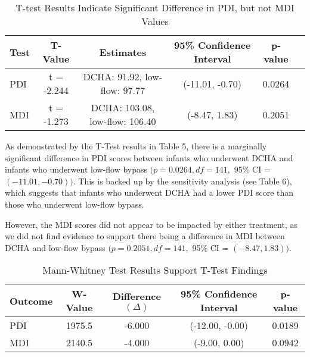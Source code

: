 \documentclass{article}
\begin{document}
\begin{enumerate}
		\newpage

		\begin{table}[h!]
			\centering
			\footnotesize
			\caption{T-test Results Indicate Significant Difference in PDI, but not MDI Values}
			\label{tab:t_test_results}
			\begin{tabular}{lccccc}
				\toprule
				\textbf{Test}   & \textbf{T-Value}  & \textbf{Estimates}           & \textbf{95\% Confidence Interval} & \textbf{p-value} \\
				\midrule
				PDI             & t = -2.244            & DCHA: 91.92, low-flow: 97.77 & (-11.01, -0.70)                  & 0.0264          \\
				MDI             & t = -1.273            & DCHA: 103.08, low-flow: 106.40 & (-8.47, 1.83)                    & 0.2051          \\
				\bottomrule
			\end{tabular}
		\end{table}

		As demonstrated by the T-Test results in Table 5, there is a marginally significant difference in PDI scores between infants who underwent DCHA and infants who underwent low-flow bypass $(p = 0.0264, df = 141,$ 95\% CI = $(-11.01, -0.70))$. This is backed up by the sensitivity analysis (see Table 6), which suggests that infants who underwent DCHA had a lower PDI score than those who underwent low-flow bypass. 

		However, the MDI scores did not appear to be impacted by either treatment, as we did not find evidence to support there being a difference in MDI between DCHA and low-flow bypass $(p = 0.2051, df = 141,$ 95\% CI = $(-8.47, 1.83))$.


		\begin{table}[h!]
			\centering
			\footnotesize
			\caption{Mann-Whitney Test Results Support T-Test Findings}
			\label{tab:mann_whitney_results}
			\begin{tabular}{lcccc}
			\toprule
			\textbf{Outcome} & \textbf{W-Value} & \textbf{Difference $(\Delta)$} & \textbf{95\% Confidence Interval} & \textbf{p-value} \\
			\midrule
			PDI              & 1975.5              & -6.000                  & (-12.00, -0.00)                & 0.0189            \\
			MDI              & 2140.5              & -4.000                  & (-9.00, 0.00)                 & 0.0942           \\
			\bottomrule
			\end{tabular}
		\end{table}




\end{enumerate}
\end{document}
